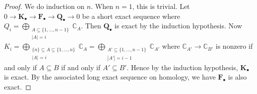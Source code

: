 \documentclass[12pt]{amsart}
\newtheorem{lem}[thm]{Lemma}
\theoremstyle{definition}
\theoremstyle{remark}
\newcommand{\bbC}{\mathbb{C}}
\newcommand{\bF}{\mathbf{F}}
\newcommand{\bK}{\mathbf{K}}
\newcommand{\bP}{\mathbf{P}}
\newcommand{\bQ}{\mathbf{Q}}
\newcommand{\dsum}{\bigoplus}
\numberwithin{equation}{section}
\begin{document}
\begin{proof}
We do induction on $n$. When $n = 1$, this is trivial. Let $0 \to \bK_{\bullet} \to \bF_{\bullet} \to \bQ_{\bullet} \to 0$ be a short exact sequence where $Q_i = \dsum_{\substack{A \subseteq \{1, \ldots, n-1 \} \\ |A| = i}} \bbC_A$. Then $\bQ_{\bullet}$ is exact by the induction hypothesis. Now $K_i = \dsum_{\substack{\{n\} \subseteq A \subseteq \{1, \ldots, n \} \\ |A| = i}} \bbC_A = \dsum_{\substack{A' \subseteq \{ 1,\ldots,n-1 \} \\ |A'| = i-1}} \bbC_{A'}$ where $\bbC_{A'} \to \bbC_{B'}$ is nonzero if and only if $A \subseteq B$ if and only if $A' \subseteq B'$. Hence by the induction hypothesis, $\bK_{\bullet}$ is exact. By the associated long exact sequence on homology, we have $\bF_{\bullet}$ is also exact.
\end{proof}


\end{document}
